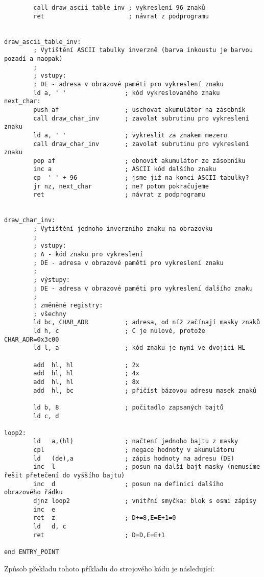 \documentclass{article}
\begin{document}
\begin{verbatim}
        call draw_ascii_table_inv ; vykreslení 96 znaků
        ret                       ; návrat z podprogramu
 
 
draw_ascii_table_inv:
        ; Vytištění ASCII tabulky inverzně (barva inkoustu je barvou pozadí a naopak)
        ;       
        ; vstupy:
        ; DE - adresa v obrazové paměti pro vykreslení znaku
        ld a, ' '                ; kód vykreslovaného znaku
next_char:
        push af                  ; uschovat akumulátor na zásobník
        call draw_char_inv       ; zavolat subrutinu pro vykreslení znaku
        ld a, ' '                ; vykreslit za znakem mezeru
        call draw_char_inv       ; zavolat subrutinu pro vykreslení znaku
        pop af                   ; obnovit akumulátor ze zásobníku
        inc a                    ; ASCII kód dalšího znaku
        cp  ' ' + 96             ; jsme již na konci ASCII tabulky?
        jr nz, next_char         ; ne? potom pokračujeme
        ret                      ; návrat z podprogramu
 
 
draw_char_inv:
        ; Vytištění jednoho inverzního znaku na obrazovku
        ;
        ; vstupy:
        ; A - kód znaku pro vykreslení
        ; DE - adresa v obrazové paměti pro vykreslení znaku
        ;
        ; výstupy:
        ; DE - adresa v obrazové paměti pro vykreslení dalšího znaku
        ;
        ; změněné registry:
        ; všechny
        ld bc, CHAR_ADR          ; adresa, od níž začínají masky znaků
        ld h, c                  ; C je nulové, protože CHAR_ADR=0x3c00
        ld l, a                  ; kód znaku je nyní ve dvojici HL
 
        add  hl, hl              ; 2x
        add  hl, hl              ; 4x
        add  hl, hl              ; 8x
        add  hl, bc              ; přičíst bázovou adresu masek znaků
 
        ld b, 8                  ; počitadlo zapsaných bajtů
        ld c, d
 
loop2:
        ld   a,(hl)              ; načtení jednoho bajtu z masky
        cpl                      ; negace hodnoty v akumulátoru
        ld   (de),a              ; zápis hodnoty na adresu (DE)
        inc  l                   ; posun na další bajt masky (nemusíme řešit přetečení do vyššího bajtu)
        inc  d                   ; posun na definici dalšího obrazového řádku
        djnz loop2               ; vnitřní smyčka: blok s osmi zápisy
        inc  e
        ret  z                   ; D+=8,E=E+1=0
        ld   d, c
        ret                      ; D=D,E=E+1
 
end ENTRY_POINT
\end{verbatim}

Způsob překladu tohoto příkladu do strojového kódu je následující:
\end{document}

